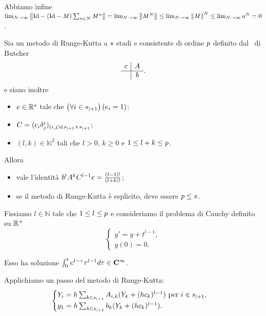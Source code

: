 \par Abbiamo infine $\lim_{N \rightarrow \infty} \Norm{\Identity - (\Identity - \Matrix)\sum_{n \in N} \Matrix^n} = \lim_{N \rightarrow \infty} \Norm{\Matrix^N} \leq \lim_{N \rightarrow \infty} \Norm{\Matrix}^N \leq \lim_{N \rightarrow \infty} a^N = 0$. \EndProof
\begin{Theorem}
	Sia un metodo di Runge-Kutta a $s$ stadi e consistente di ordine $p$ definito dal \tableau\ di Butcher
	\[
	\begin{array}{c|c}
		c	&	A\\
		\hline
			&	b
	\end{array}.
	\]
	e siano inoltre
	\begin{itemize}
		\item $e \in \mathbb{R}^s$ tale che $\left ( \forall i \in {s}_{|+ 1} \right ) \left ( e_i = 1 \right )$;
		\item $C = (c_i\delta^{i}_{j})_{(i,j) \in {s}_{|+ 1}\times{s}_{|+ 1}}$;
		\item $(l,k) \in \mathbb{N}^2$ tali che $l > 0$, $k \geq 0$ e $1 \leq l + k \leq p$.
	\end{itemize}
	Allora
	\begin{itemize}
		\item vale l'identit\`a ${b}^tA^kC^{l - 1} e = \frac{(l - 1)!}{(l + k)!}$;
		\item se il metodo di Runge-Kutta \`e esplicito, deve essere $p \leq s$.
	\end{itemize}
\end{Theorem}
\Proof Fissiamo $l \in \mathbb{N}$ tale che $1 \leq l \leq p$ e consideriamo il problema di Cauchy definito su $\mathbb{R}^+$
\[
\begin{cases}
	y' = y + t^{l - 1},\\
	y(0) = 0.
\end{cases}
\]
\par Esso ha soluzione $\int_0^t e^{t -\tau}\tau^{l - 1}d\tau \in \CClass{\infty}$.
\par Applichiamo un passo del metodo di Runge-Kutta:
\[
\begin{cases}
	Y_i = h\sum_{k \in {s}_{|+ 1}} A_{i,k}(Y_k + (h c_k)^{l - 1})\text{ per }i \in {s}_{|+ 1},\\
	y_1 = h\sum_{k \in {s}_{|+ 1}} b_k(Y_k + (h c_k)^{l - 1}).
\end{cases}
\]
